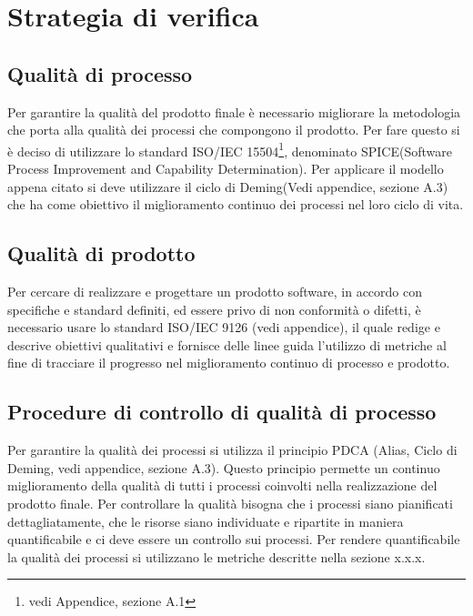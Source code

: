 \newpage
\section{Strategia di verifica}%
\label{2.0}
\subsection{Qualità di processo} %
\label{2.1}
Per garantire la qualità del prodotto finale è necessario migliorare la metodologia che porta alla qualità dei processi che compongono il prodotto. Per fare questo si è deciso di utilizzare lo standard ISO/IEC 15504\footnote{vedi Appendice, sezione A.1}, denominato SPICE(Software Process Improvement and Capability Determination).
Per applicare il modello appena citato si deve utilizzare il ciclo di Deming(Vedi appendice, sezione A.3) che ha come obiettivo il miglioramento continuo dei processi nel loro ciclo di vita.

\subsection{Qualità di prodotto} %
\label{2.2}
Per cercare di realizzare e progettare un prodotto software, in accordo con specifiche e standard definiti, ed essere privo di non conformità o difetti, è necessario usare lo standard ISO/IEC 9126 (vedi appendice), il quale redige e descrive obiettivi qualitativi e fornisce delle linee guida l'utilizzo di metriche al fine di tracciare il progresso nel miglioramento continuo di processo e prodotto.

\subsection{Procedure di controllo di qualità di processo} %
\label{2.3}
Per garantire la qualità dei processi si utilizza il principio PDCA (Alias, Ciclo di Deming, vedi appendice, sezione A.3).  Questo principio permette un continuo miglioramento della qualità di tutti i processi coinvolti nella realizzazione del prodotto finale.
Per controllare la qualità bisogna che i processi siano pianificati dettagliatamente, che le risorse siano individuate e ripartite in maniera quantificabile e ci deve essere un controllo sui processi.
Per rendere quantificabile la qualità dei processi si utilizzano le metriche descritte nella sezione x.x.x.

